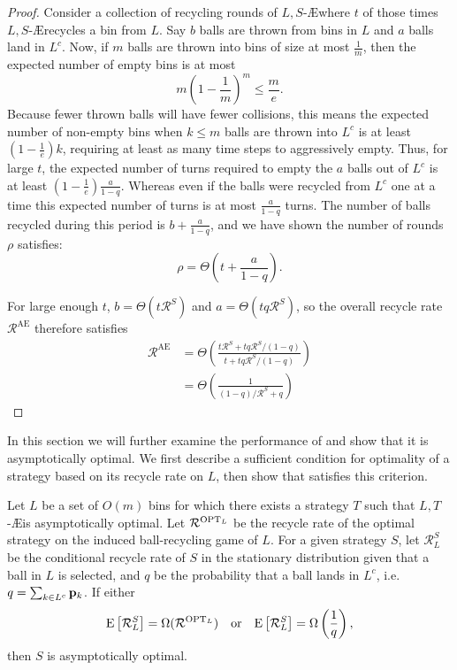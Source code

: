 \begin{proof}
	Consider a collection of recycling rounds of $L,S$-\AE where $t$ of those
	times $L,S$-\AE recycles a bin from $L$. Say $b$ balls are thrown from bins
	in $L$ and $a$ balls land in $L^c$. Now, if $m$ balls are thrown into bins
	of size at most $\frac{1}{m}$, then the expected number of empty bins is at
	most \[ m \left(1 - \frac{1}{m}\right)^m \leq \frac{m}{e}.\] Because fewer
	thrown balls will have fewer collisions, this means the expected number of
	non-empty bins when $k \leq m$ balls are thrown into $L^c$ is at least
	$\left(1-\frac{1}{e}\right)k$, requiring at least as many time steps to
	aggressively empty. Thus, for large $t$, the expected number of turns
	required to empty the $a$ balls out of $L^c$ is at least
	$\left(1-\frac{1}{e}\right)\frac{a}{1-q}$. Whereas even if the balls were
	recycled from $L^c$ one at a time this expected number of turns is at most
	$\frac{a}{1 - q}$ turns. The number of balls recycled during this period is
	$b + \frac{a}{1 - q}$, and we have shown the number of rounds $\rho$
	satisfies: \[\rho = \Theta\left(t + \frac{a}{1-q}\right).\]

	For large enough $t$, $b = \Theta\left(t\mathcal{R}^S\right)$ and
	$a = \Theta\left(tq\mathcal{R}^S\right)$, so the overall recycle rate
	$\mathcal{R}^\textrm{AE}$ therefore satisfies
	\begin{align*}
		\mathcal{R}^\textrm{AE} &= \Theta\left(\frac{t\mathcal{R}^S + tq\mathcal{R}^S/(1 - q)}{t + tq\mathcal{R}^S/(1 - q)}\right) \\
		&= \Theta\left(\frac{1}{(1 - q)/\mathcal{R}^S + q}\right)
	\end{align*}
\end{proof}


In this section we will further examine the performance of \RB and show that it
is asymptotically optimal. We first describe a sufficient condition for
optimality of a strategy based on its recycle rate on $L$, then show that \RB
satisfies this criterion.

\begin{lemma}\label{lem:rl-opt}
	Let $L$ be a set of $O(m)$ bins for which there exists a strategy $T$ such
	that $L,T$-\AE is asymptotically optimal.  Let $\mathcal{R}^{\mathrm{OPT}_L}$ be
	the recycle rate of the optimal strategy on the induced ball-recycling game
	of $L$.  For a given strategy $S$, let $\mathcal{R}_L^S$ be the conditional
	recycle rate of $S$ in the stationary distribution given that a ball in $L$
	is selected, and $q$ be the probability that a ball lands in $L^c$, i.e. $q
	= \sum_{k \in L^c} \mathbf{p}_k$. If either
	\[ \mathrm{E}\left[\mathcal{R}_L^S\right] = \Omega(\mathcal{R}^{\mathrm{OPT}_L})
	\quad\textrm{or}\quad\mathrm{E}\left[\mathcal{R}_L^S\right] =
	\Omega\left(\frac{1}{q}\right),\]
	then $S$ is asymptotically optimal.
\end{lemma}

